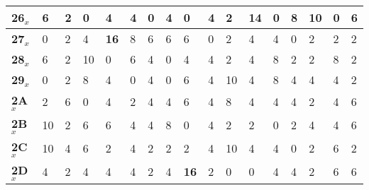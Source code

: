 \begin{longtable}[c]{|l|l|l|l|l|l|l|l|l|l|l|l|l|l|l|l|l|}
\textbf{26$_x$} & 6              & 2              & 0              & 4              & 4              & 0              & 4              & 0              & 4              & 2              & 14             & 0              & 8              & 10             & 0              & 6              \\ \hline
\textbf{27$_x$} & 0              & 2              & 4              & \textbf{16}             & 8              & 6              & 6              & 6              & 0              & 2              & 4              & 4              & 0              & 2              & 2              & 2              \\ \hline
\textbf{28$_x$} & 6              & 2              & 10             & 0              & 6              & 4              & 0              & 4              & 4              & 2              & 4              & 8              & 2              & 2              & 8              & 2              \\ \hline
\textbf{29$_x$} & 0              & 2              & 8              & 4              & 0              & 4              & 0              & 6              & 4              & 10             & 4              & 8              & 4              & 4              & 4              & 2              \\ \hline
\textbf{2A$_x$} & 2              & 6              & 0              & 4              & 2              & 4              & 4              & 6              & 4              & 8              & 4              & 4              & 4              & 2              & 4              & 6              \\ \hline
\textbf{2B$_x$} & 10             & 2              & 6              & 6              & 4              & 4              & 8              & 0              & 4              & 2              & 2              & 0              & 2              & 4              & 4              & 6              \\ \hline
\textbf{2C$_x$} & 10             & 4              & 6              & 2              & 4              & 2              & 2              & 2              & 4              & 10             & 4              & 4              & 0              & 2              & 6              & 2              \\ \hline
\textbf{2D$_x$} & 4              & 2              & 4              & 4              & 4              & 2              & 4              & \textbf{16}             & 2              & 0              & 0              & 4              & 4              & 2              & 6              & 6              \\ \hline

\end{longtable}
